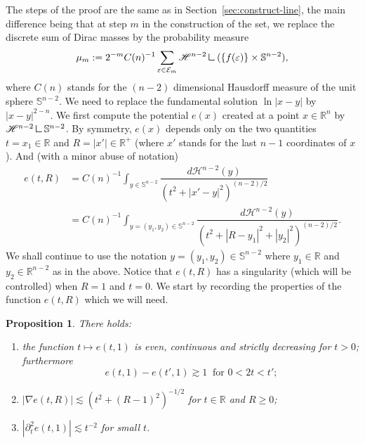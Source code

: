 \documentclass[JEP,XML,SOM,Unicode,published]{cedram}
\newenvironment{enumeratei}
{\bgroup\def\theenumi{\roman{enumi}}\def\theenumii{\arabic{enumii}}\begin{enumerate}}
{\end{enumerate}\egroup}
\numberwithin{equation}{section}
\theoremstyle{plain}
\newtheorem{pro}[lem]{Proposition}
\theoremstyle{definition}
\newcommand{\R}{\mathbb{R}}
\newcommand{\R}{\mathbb{R}}
\newcommand{\cE}{{\mathcal E}}
\newcommand{\mres}{\mathbin{\vrule height 1.6ex depth 0pt width
0.13ex\vrule height 0.13ex depth 0pt width 1.3ex}}
\begin{document}
The steps of the proof are the same as in Section~\ref{sec:construct-line}, the main difference being that at step $m$ in the construction of the set, we replace the discrete sum of Dirac masses by the probability measure\vspace*{-3pt}
\[
\mu_m:= 2^{-m}C(n)^{-1}\sum_{\varepsilon \in \cE_m} \mathscr{H}^{n-2}\mres (\{f(\varepsilon)\}\times \mathbb{S}^{n-2}),
\]
where $C(n)$ stands for the $(n-2)$ dimensional Hausdorff measure of the unit sphere $\mathbb{S}^{n-2}$.
We need to replace the fundamental solution $\ln|x -y|$ by $|x-y|^{2-n}$.
We first compute the potential $e(x)$ created at a point $x\in \R^n$ by $\mathscr{H}^{n-2}\mres \mathbb{S}^{n-2}$.
By symmetry, $e(x)$ depends only on the two quantities $t = x_1 \in \R$ and $R = |x'| \in \R^+$ (where $x'$ stands for
the last $n-1$ coordinates of $x$). And (with a minor abuse of notation)
\begin{equation*}
\begin{aligned}
e(t,R) &= C(n)^{-1} \int_{y\in \mathbb{S}^{n-2}} \dfrac{d \mathscr{H}^{n-2}(y)}{(t^2+ |x'-y|^2)^{(n-2)/2}}
\\ &= C(n)^{-1} \int_{y=(y_1,y_2)\in \mathbb{S}^{n-2}} \dfrac{d \mathscr{H}^{n-2}(y)}{(t^2+ |R-y_1|^2 +|y_2|^2)^{(n-2)/2}}.
\end{aligned}
\end{equation*}
We shall continue to use the notation $y = (y_1, y_2) \in \mathbb{S}^{n-2}$ where $y_1 \in \R$ and $y_2 \in \R^{n-2}$
as in the above.
Notice that $e(t,R)$ has a singularity (which will be controlled) when $R=1$ and $t=0$.
We start by recording the properties of the function $e(t,R)$ which we will need.
\begin{pro}\label{pro:fundsol} There holds:
\begin{enumeratei}
\item the function $t\mapsto e(t,1)$ is even, continuous and strictly decreasing for $t>0$;
furthermore\vspace*{-3pt}
\label{e-continuous}
\[
e(t, 1)-e(t',1) \gtrsim 1 \ \text{ for $0<2t<t'$;}
\]
\item $|\nabla e(t,R)| \lesssim (t^2 + (R-1)^2)^{-1/2}$ for $t \in \R$ and $R \geq 0$;
\label{e-derivative}
\item $|\partial^2_te(t,1)| \lesssim t^{-2}$ for small $t$.\label{e-secondderivative}
\end{enumeratei}
\end{pro}
\end{document}
